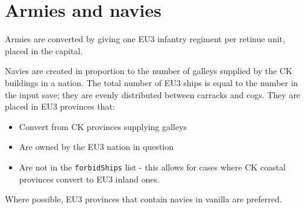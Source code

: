 \documentclass[12pt,ebook,oneside]{book}
\begin{document}
\section{Armies and navies}

Armies are converted by giving one EU3 infantry regiment per retinue
unit, placed in the capital. 

Navies are created in proportion to the number of galleys supplied by
the CK buildings in a nation. The total number of EU3 ships is equal
to the number in the input save; they are evenly distributed
between carracks and cogs. They are placed in EU3 provinces that:
\begin{itemize}
\item Convert from CK provinces supplying galleys
\item Are owned by the EU3 nation in question
\item Are not in the \verb|forbidShips| list - this allows for cases
  where CK coastal provinces convert to EU3 inland ones.
\end{itemize}
Where possible, EU3 provinces that contain navies in vanilla are
preferred. 
\end{document}
